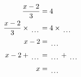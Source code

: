 \documentclass[12pt]{article}
\begin{document}
\begin{multicols}{2}
\begin{minipage}[t]{0.45\textwidth}
    \raggedright %
    \begin{align*} %
        \frac{x - 2}{3} &= 4\\
        \frac{x - 2}{3} \times\dotuline{\hspace{5mm}} &= 4 \times\dotuline{\hspace{5mm}}\\
        x - 2 &= \dotuline{\hspace{5mm}}\\
        x - 2 + \dotuline{\hspace{5mm}} &= \dotuline{\hspace{5mm}} + \dotuline{\hspace{5mm}}\\
        x &= \dotuline{\hspace{5mm}}\\
    \end{align*}
\end{minipage}\newpage
    
\end{multicols}
\end{document}
